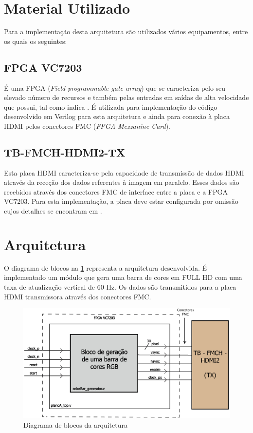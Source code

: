 \documentclass[11pt,a4paper]{article}
\begin{document}
	\section{Material Utilizado}
	Para a implementação desta arquitetura são utilizados vários equipamentos, entre os quais os seguintes:
	\subsection{FPGA VC7203}
	É uma FPGA (\textit{Field-programmable gate array}) que se caracteriza pelo seu elevado número de recursos e também pelas entradas em saídas de alta velocidade que possui, tal como indica \cite{R008}. É utilizada para implementação do código desenvolvido em Verilog para esta arquitetura e ainda para conexão à placa HDMI pelos conectores FMC (\textit{FPGA Mezzanine Card}).
	\subsection{TB-FMCH-HDMI2-TX}
	Esta placa HDMI caracteriza-se pela capacidade de transmissão de dados HDMI através da receção dos dados referentes à imagem em paralelo. Esses dados são recebidos através dos conectores FMC de interface entre a placa e a FPGA VC7203. Para esta implementação, a placa deve estar configurada por omissão cujos detalhes se encontram em \cite{R009}.
	
	\section{Arquitetura}
	
	O diagrama de blocos na \cref{fig:planoA} representa a arquitetura desenvolvida. É implementado um módulo que gera uma barra de cores em FULL HD com uma taxa de atualização vertical de 60 Hz. Os dados são transmitidos para a placa HDMI transmissora através dos conectores FMC.
	\begin{figure}[h!]
		\begin{center}
			\includegraphics[width=1.0\textwidth]{planA} 
			\caption{Diagrama de blocos da arquitetura}
			\label{fig:planoA}
		\end{center}
	\end{figure}
\end{document}
